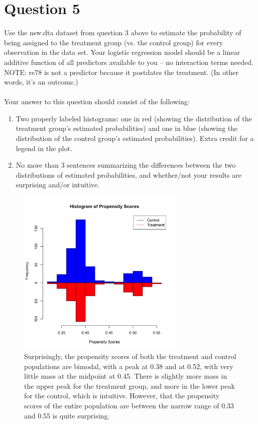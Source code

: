 \documentclass[11pt, oneside]{article}
\begin{document}
\section*{Question 5}
Use the nsw.dta dataset from question 3 above to estimate the probability of being assigned to the treatment group (vs. the control group) for every observation in the data set. Your logistic regression model should be a linear additive function of all predictors available to you -- no interaction terms needed. NOTE: re78 is not a predictor because it postdates the treatment. (In other words, it's an outcome.) \\ \\ 
Your answer to this question should consist of the following:
\begin{enumerate}[label=(\alph*)]
\item Two properly labeled histograms: one in red (showing the distribution of the treatment group's estimated probabilities) and one in blue (showing the distribution of the control group's estimated probabilities). Extra credit for a legend in the plot.
\item No more than 3 sentences summarizing the differences between the two distributions of estimated probabilities, and whether/not your results are surprising and/or intuitive.
\end{enumerate}
\begin{figure}[h]
	\includegraphics[width = 8cm, height = 8cm]{propensity.jpg}
	\caption{Surprisingly, the propensity scores of both the treatment and control populations are bimodal, with a peak at 0.38 and at 0.52, with very little mass at the midpoint at 0.45. There is slightly more mass in the upper peak for the treatment group, and more in the lower peak for the control, which is intuitive. However, that the propensity scores of the entire population are between the narrow range of 0.33 and 0.55 is quite surprising. }
\end{figure}
\end{document}

